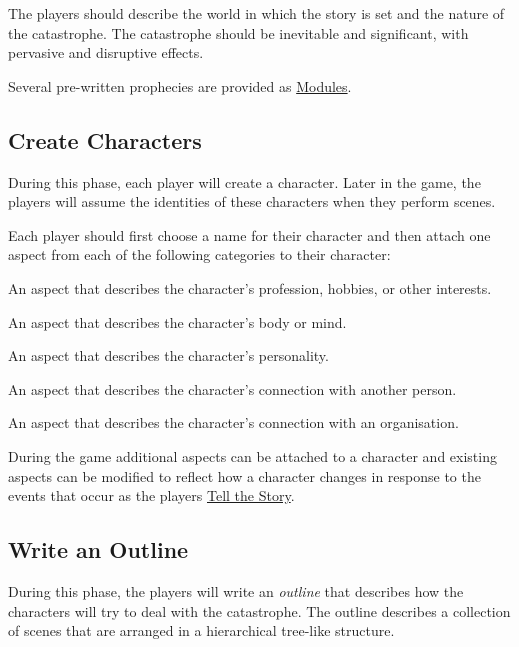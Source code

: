 \documentclass[12pt, a5paper, parskip=half-]{scrartcl}
\begin{document}
The players should describe the world in which the story is set and the nature of the catastrophe.
The catastrophe should be inevitable and significant, with pervasive and disruptive effects.

Several pre-written  prophecies are provided as \hyperref[section:modules]{\cinzel \small Modules}.

\newpage

\subsection*{Create Characters} \label{subsection:create-characters}
During this phase, each player will create a character.
Later in the game, the players will assume the identities of these characters when they perform scenes.

Each player should first choose a name for their character and then attach one aspect from each of the following categories to their character:
\begin{description}[labelindent=0.25cm, leftmargin=\widthof{\hspace{0.25cm}\textbullet\space}, font=\normalfont\textbullet\bfseries\space]
   \item[Occupation:]
     An aspect that describes the character's profession, hobbies, or other interests.
   \item[Physical Characteristic:]
     An aspect that describes the character's body or mind.
   \item[Psychological Characteristic:]
     An aspect that describes the character's personality.
   \item[Relationship:]
     An aspect that describes the character's connection with another person.
   \item[Affiliation:]
     An aspect that describes the character's connection with an organisation.
\end{description}

\bigskip

During the game additional aspects can be attached to a character and existing aspects can be modified to reflect how a character changes in response to the events that occur as the players \hyperref[subsection:tell-the-story]{\cinzel \small Tell the Story}.

\newpage

\subsection*{Write an Outline} \label{subsection:write-an-outline}
During this phase, the players will write an \emph{outline} that describes how the characters will try to deal with the catastrophe.
The outline describes a collection of scenes that are arranged in a hierarchical tree-like structure.
\end{document}
